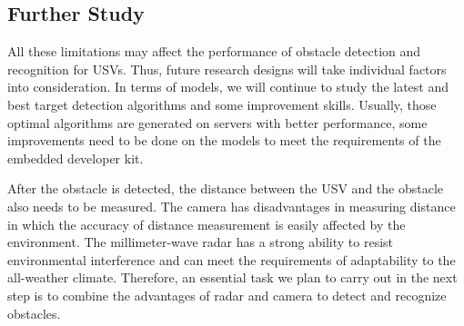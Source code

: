 \documentclass[sensors,article,submit,moreauthors,pdftex]{Definitions/mdpi}
\begin{document}
\begin{paracol}{2}
\subsection{Further Study}

All these limitations may affect the performance of obstacle detection and recognition for USVs. Thus, future research designs will take individual factors into consideration. In terms of models, we will continue to study the latest and best target detection algorithms and some improvement skills. Usually, those optimal algorithms are generated on servers with better performance, some improvements need to be done on the models to meet the requirements of the embedded developer kit.

After the obstacle is detected, the distance between the USV and the obstacle also needs to be measured. The camera has disadvantages in measuring distance in which the accuracy of distance measurement is easily affected by the environment. The millimeter-wave radar has a strong ability to resist environmental interference and can meet the requirements of adaptability to the all-weather climate. Therefore, an essential task we plan to carry out in the next step is to combine the advantages of radar and camera to detect and recognize obstacles.




\vspace{6pt} 





\end{paracol}



\end{document}
